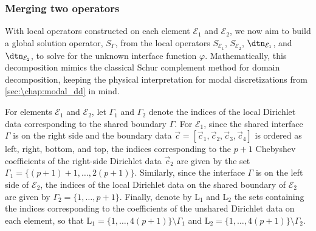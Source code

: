 \subsubsection{Merging two operators}
With local operators constructed on each element $\mathcal{E}_1$ and $\mathcal{E}_2$, we now aim to build a global solution operator, $S_\Gamma$, from the local operators $S_{\mathcal{E}_1}$, $S_{\mathcal{E}_2}$, $\dtn_{\mathcal{E}_1}$, and $\dtn_{\mathcal{E}_2}$, to solve for the unknown interface function $\varphi$. Mathematically, this decomposition mimics the classical Schur complement method for domain decomposition, keeping the physical interpretation for modal discretizations from \cref{sec:\chap:modal_dd} in mind.

For elements $\mathcal{E}_1$ and $\mathcal{E}_2$, let $\Gamma_1$ and $\Gamma_2$ denote the indices of the local Dirichlet data corresponding to the shared boundary $\Gamma$. For $\mathcal{E}_1$, since the shared interface $\Gamma$ is on the right side and the boundary data $\vec{c} = [\vec{c}_1, \vec{c}_2, \vec{c}_3, \vec{c}_4]$ is ordered as left, right, bottom, and top, the indices corresponding to the $p+1$ Chebyshev coefficients of the right-side Dirichlet data $\vec{c}_2$ are given by the set $\Gamma_1 = \{(p+1)+1, \ldots, 2(p+1)\}$. Similarly, since the interface $\Gamma$ is on the left side of $\mathcal{E}_2$, the indices of the local Dirichlet data on the shared boundary of $\mathcal{E}_2$ are given by $\Gamma_2 = \{1, \ldots, p+1\}$. Finally, denote by $\mathrm{L}_1$ and $\mathrm{L}_2$ the sets containing the indices corresponding to the coefficients of the unshared Dirichlet data on each element, so that $\mathrm{L}_1 = \{1, \ldots, 4(p+1)\} \setminus \Gamma_1$ and $\mathrm{L}_2 = \{1, \ldots, 4(p+1)\} \setminus \Gamma_2$.

